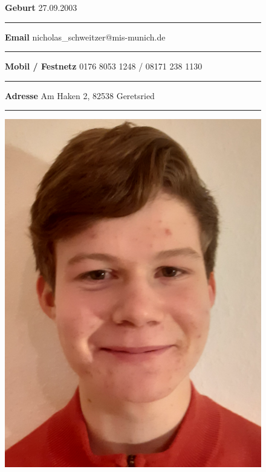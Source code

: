 \documentclass[12pt]{article}
\newcommand{\sep}{{\color{gray}\vspace{-12pt}\hrule}}
\begin{document}
\begin{figure}[htb!]
  \begin{minipage}{0.7\textwidth}
    \textbf{Geburt} \hfill{27.09.2003} \, \\
    \sep
    \vspace{7pt}
    \textbf{Email} \hfill{nicholas\_schweitzer@mis-munich.de} \, \\
    \sep
    \vspace{7pt}
    \textbf{Mobil / Festnetz} \hfill{0176 8053 1248 / 08171 238 1130} \, \\
    \sep
    \vspace{7pt}
    \textbf{Adresse} \hfill{Am Haken 2, 82538 Geretsried \, }\\
    \sep
    \vspace{7pt}
  \end{minipage}
  \begin{minipage}{0.29\textwidth}
    \hfill
    \includegraphics[trim=-50 -100 0 0mm, scale=0.05]{picture-cropped.png}
  \end{minipage}
\end{figure}
\vspace{-30pt}
\end{document}
